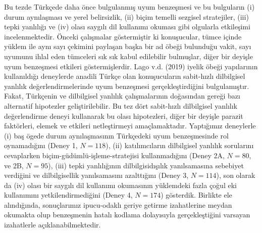 Bu tezde T\"urk\c{c}ede daha \"once bulgulanm{\i}\c{s} uyum benze\c{s}mesi ve bu bulgular{\i}n (i) durum ayn{\i}la\c{s}mas{\i} ve yerel belirsizlik, (ii) bi\c{c}im temelli sezgisel stratejiler, (iii) tepki yanl{\i}l{\i}\u{g}{\i} ve (iv) olas{\i} sayg{\i}l{\i} dil kullan{\i}m{\i} okumas{\i} gibi olgularla etkile\c{s}imi incelenmektedir. \"Onceki \c{c}al{\i}\c{s}malar g\"ostermi\c{s}tir ki konu\c{s}ucular, t\"umce i\c{c}inde y\"uklem ile ayn{\i} say{\i} \c{c}ekimini payla\c{s}an ba\c{s}ka bir ad \"obe\u{g}i bulundu\u{g}u vakit, say{\i} uyumunu ihlal eden t\"umceleri s{\i}k s{\i}k kabul edilebilir bulmu\c{s}lar, di\u{g}er bir deyi\c{s}le uyum benze\c{s}mesi etkileri g\"ostermi\c{s}lerdir. Lago v.d. (2019) iyelik \"obe\u{g}i yap{\i}lar{\i}n{\i}n kullan{\i}ld{\i}\u{g}{\i} deneylerde anadili T\"urk\c{c}e olan konu\c{s}ucular{\i}n sabit-h{\i}zl{\i} dilbilgisel yanl{\i}l{\i}k de\u{g}erlendirmelerinde uyum benze\c{s}mesi ger\c{c}ekle\c{s}tirdi\u{g}ini bulgulam{\i}\c{s}t{\i}r. Fakat, T\"urk\c{c}enin ve dilbilgisel yanl{\i}l{\i}k \c{c}al{\i}\c{s}malar{\i}n{\i}n do\u{g}as{\i}ndan gere\u{g}i baz{\i} alternatif hipotezler geli\c{s}tirilebilir. Bu tez d\"ort sabit-h{\i}zl{\i} dilbilgisel yanl{\i}l{\i}k de\u{g}erlendirme deneyi kullanarak bu olas{\i} hipotezleri, di\u{g}er bir deyi\c{s}le parazit fakt\"orleri, elemek ve etkileri netle\c{s}tirmeyi ama\c{c}lamaktad{\i}r. Yapt{\i}\u{g}{\i}m{\i}z deneylerle (i) ba\c{s} \"ogede durum ayn{\i}la\c{s}mas{\i}n{\i}n T\"urk\c{c}edeki uyum benze\c{s}mesinde rol oynamad{\i}\u{g}{\i}n{\i} (Deney 1, $N=118$), (ii) kat{\i}l{\i}mc{\i}lar{\i}n dilbilgisel yanl{\i}l{\i}k sorular{\i}n{\i} cevaplarken bi\c{c}im-g\"ud\"uml\"u-i\c{s}leme-stratejisi kullanmad{\i}\u{g}{\i}n{\i} (Deney 2A, $N=80$, ve 2B, $N=95$), (iii) tepki yanl{\i}l{\i}\u{g}{\i}n{\i}n dilbilgisid{\i}\c{s}{\i}l{\i}k yan{\i}lsamas{\i}na sebebiyet verdi\u{g}ini ve dilbilgisellik yan{\i}lsamas{\i}n{\i} azaltt{\i}\u{g}{\i}n{\i} (Deney 3, $N=114$), son olarak da (iv) olas{\i} bir sayg{\i}l{\i} dil kullan{\i}m{\i} okumas{\i}n{\i}n y\"uklemdeki fazla \c{c}o\u{g}ul eki kullan{\i}m{\i}n{\i} yetkilendirmedi\u{g}ini (Deney 4, $N=174$) g\"osterdik. Birlikte ele al{\i}nd{\i}\u{g}{\i}nda, sonu\c{c}lar{\i}m{\i}z ipucu-odakl{\i} geriye getirme izahatlerine meydan okumakta olup benze\c{s}menin hatal{\i} kodlama dolay{\i}s{\i}yla ger\c{c}ekle\c{s}ti\u{g}ini varsayan izahatlerle a\c{c}{\i}klanabilmektedir.